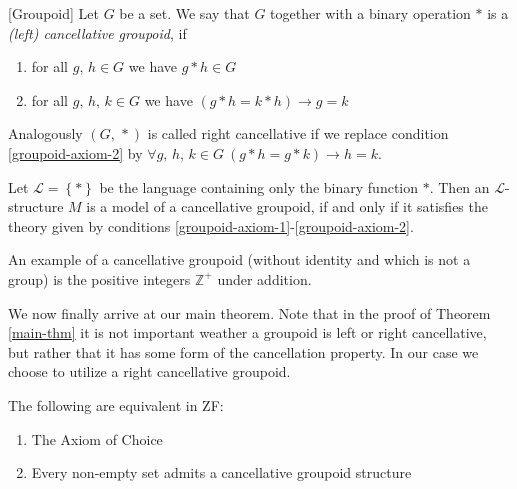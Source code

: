 \documentclass[../../main.tex]{subfiles}
\begin{document}
\begin{definition}\label{groupoid-def}[Groupoid]
    Let $G$ be a set.
    We say that $G$ together with a binary operation $*$ is a \emph{(left) cancellative groupoid}, if 
    \begin{enumerate}[label=(\roman*)]
        \item \label{groupoid-axiom-1} for all $g,\, h \in G$ we have $g * h \in G$
        \item \label{groupoid-axiom-2} for all $g,\, h,\, k \in G$ we have $\left(g * h = k * h\right) \rightarrow g = k$
    \end{enumerate}
    Analogously $\left(G,\, *\right)$ is called right cancellative if we replace condition \ref{groupoid-axiom-2} by
    $\forall g,\, h,\, k \in G \ \left(g * h = g * k\right) \rightarrow h = k$.

    Let $\mathcal{L} = \left\{*\right\}$ be the language containing only the binary function $*$.
    Then an $\mathcal{L}$-structure $M$ is a model of a cancellative groupoid, 
    if and only if it satisfies the theory given by conditions \ref{groupoid-axiom-1}-\ref{groupoid-axiom-2}.
\end{definition}
An example of a cancellative groupoid (without identity and which is not a group) is the positive integers $\mathbb{Z}^+$ under addition.

We now finally arrive at our main theorem.
Note that in the proof of Theorem \ref{main-thm} it is not important weather a groupoid is left or right cancellative,
but rather that it has some form of the cancellation property.
In our case we choose to utilize a right cancellative groupoid.

\begin{theorem}\cite{Haj72}\label{main-thm}
    The following are equivalent in ZF:
    \begin{enumerate}
        \item The Axiom of Choice
        \item Every non-empty set admits a cancellative groupoid structure
    \end{enumerate}
\end{theorem}
\end{document}
